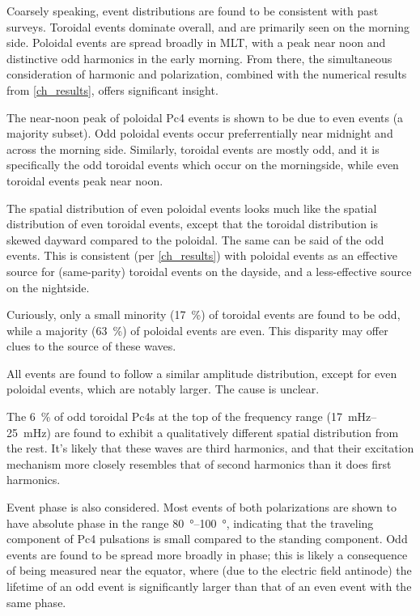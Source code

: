 Coarsely speaking, event distributions are found to be consistent with past
surveys. Toroidal events dominate overall, and are primarily seen on the
morning side. Poloidal events are spread broadly in MLT, with a peak near noon
and distinctive odd harmonics in the early morning. From there, the
simultaneous consideration of harmonic and polarization, combined with the
numerical results from \cref{ch_results}, offers significant insight. 

The near-noon peak of poloidal Pc4 events is shown to be due to even events (a
majority subset). Odd poloidal events occur preferrentially near midnight and
across the morning side. Similarly, toroidal events are mostly odd, and it is
specifically the odd toroidal events which occur on the morningside, while even
toroidal events peak near noon. 

The spatial distribution of even poloidal events looks much like the spatial
distribution of even toroidal events, except that the toroidal distribution is
skewed dayward compared to the poloidal. The same can be said of the odd
events. This is consistent (per \cref{ch_results}) with poloidal events as an
effective source for (same-parity) toroidal events on the dayside, and a
less-effective source on the nightside. 

Curiously, only a small minority (\SI{17}{\percent}) of toroidal events are
found to be odd, while a majority (\SI{63}{\percent}) of poloidal events are
even. This disparity may offer clues to the source of these waves. 

All events are found to follow a similar amplitude distribution, except for
even poloidal events, which are notably larger. The cause is unclear. 

The \about\SI{6}{\percent} of odd toroidal Pc4s at the top of the frequency
range (\SIrange{17}{25}{\mHz}) are found to exhibit a qualitatively different
spatial distribution from the rest. It's likely that these waves are third
harmonics, and that their excitation mechanism more closely resembles that of
second harmonics than it does first harmonics. 

Event phase is also considered. Most events of both polarizations are shown to
have absolute phase in the range \SIrange{80}{100}{\degree}, indicating that
the traveling component of Pc4 pulsations is small compared to the standing
component. Odd events are found to be spread more broadly in phase; this is
likely a consequence of being measured near the equator, where (due to the
electric field antinode) the lifetime of an odd event is significantly larger
than that of an even event with the same phase. 

